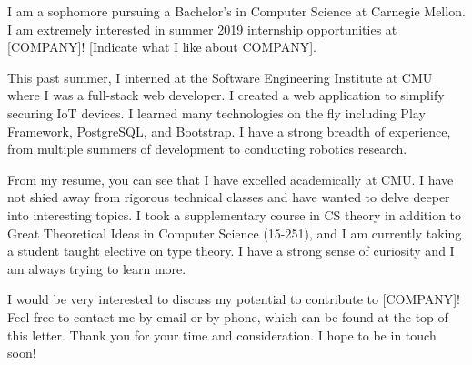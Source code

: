 \documentclass[12pt,stdletter,dateno,sigleft]{newlfm} %
\begin{document}
\begin{newlfm}


I am a sophomore pursuing a Bachelor's in Computer Science at Carnegie Mellon. I
am extremely interested in summer 2019 internship opportunities at [COMPANY]!
[Indicate what I like about COMPANY].

This past summer, I interned at the Software Engineering Institute at CMU where
I was a full-stack web developer. I created a web application to simplify
securing IoT devices. I learned many technologies on the fly including Play
Framework, PostgreSQL, and Bootstrap. I have a strong breadth of experience,
from multiple summers of development to conducting robotics research.

From my resume, you can see that I have excelled academically at CMU. I have not
shied away from rigorous technical classes and have wanted to delve deeper into
interesting topics. I took a supplementary course in CS theory in addition to
Great Theoretical Ideas in Computer Science (15-251), and I am currently taking
a student taught elective on type theory. I have a strong sense of curiosity and
I am always trying to learn more.

I would be very interested to discuss my potential to contribute to
[COMPANY]! Feel free to contact me by email or by phone, which can be
found at the top of this letter. Thank you for your time and consideration. I
hope to be in touch soon!


\end{newlfm}
\end{document}
